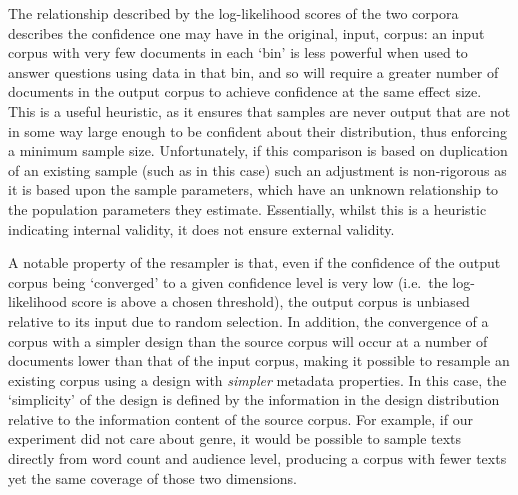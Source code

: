 













The relationship described by the log-likelihood scores of the two corpora describes the confidence one may have in the original, input, corpus: an input corpus with very few documents in each `bin' is less powerful when used to answer questions using data in that bin, and so will require a greater number of documents in the output corpus to achieve confidence at the same effect size.  This is a useful heuristic, as it ensures that samples are never output that are not in some way large enough to be confident about their distribution, thus enforcing a minimum sample size.  Unfortunately, if this comparison is based on duplication of an existing sample (such as in this case) such an adjustment is non-rigorous as it is based upon the sample parameters, which have an unknown relationship to the population parameters they estimate.  Essentially, whilst this is a heuristic indicating internal validity, it does not ensure external validity.

A notable property of the resampler is that, even if the confidence of the output corpus being `converged' to a given confidence level is very low (i.e.\ the log-likelihood score is above a chosen threshold), the output corpus is unbiased relative to its input due to random selection.  In addition, the convergence of a corpus with a simpler design than the source corpus will occur at a number of documents lower than that of the input corpus, making it possible to resample an existing corpus using a design with \textit{simpler} metadata properties.  In this case, the `simplicity' of the design is defined by the information in the design distribution relative to the information content of the source corpus.  For example, if our experiment did not care about genre, it would be possible to sample texts directly from word count and audience level, producing a corpus with fewer texts yet the same coverage of those two dimensions.






